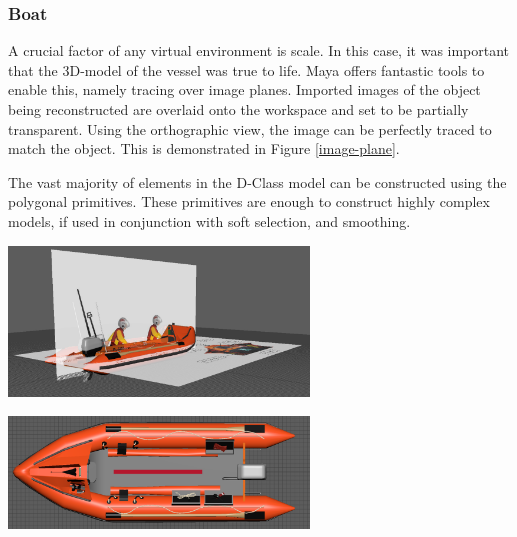 \documentclass[ %
                    author={Elis Jones},
                supervisor={Dr. Kirsten Cater},
                    degree={BSc},
                     title={The Effect of Presentation Medium on Spatial Cognition},
                  subtitle={in the Virtual Environment},
                      year={2018} ]{dissertation}
\begin{document}
\subsubsection{Boat}
A crucial factor of any virtual environment is scale. In this case, it was important that the 3D-model of the vessel was true to life. Maya offers fantastic tools to enable this, namely tracing over image planes. Imported images of the object being reconstructed are overlaid onto the workspace and set to be partially transparent. Using the orthographic view, the image can be perfectly traced to match the object. This is demonstrated in Figure \ref{image-plane}. 

The vast majority of elements in the D-Class model can be constructed using the polygonal primitives. These primitives are enough to construct highly complex models, if used in conjunction with soft selection, and smoothing.

\begin{minipage}{\textwidth}
\hfill \break
\centering
\includegraphics[width=0.6\textwidth]{images/image_planes}
\label{image-plane}
\hfill \break
\end{minipage}

\begin{minipage}{\textwidth}
\hfill \break
\centering
\includegraphics[width=0.6\textwidth]{images/top_model}
\label{model}
\hfill \break
\end{minipage}
\end{document}
